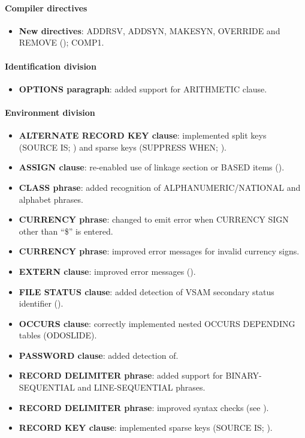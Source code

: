 \paragraph{Compiler directives}
\begin{itemize}
\item \textbf{New directives}: ADDRSV, ADDSYN, MAKESYN, OVERRIDE and REMOVE (); COMP1.
\end{itemize}

\paragraph{Identification division}
\begin{itemize}
\item \textbf{OPTIONS paragraph}: added support for ARITHMETIC clause.
\end{itemize}

\paragraph{Environment division}
\begin{itemize}
\item \textbf{ALTERNATE RECORD KEY clause}: implemented split keys (SOURCE IS; ) and sparse keys (SUPPRESS WHEN; ).
\item \textbf{ASSIGN clause}: re-enabled use of linkage section or BASED items ().
\item \textbf{CLASS phrase}: added recognition of ALPHANUMERIC\slash{}NATIONAL and alphabet phrases.
\item \textbf{CURRENCY phrase}: changed to emit error when CURRENCY SIGN other than ``\$'' is entered.
\item \textbf{CURRENCY phrase}: improved error messages for invalid currency signs.
\item \textbf{EXTERN clause}: improved error messages ().
\item \textbf{FILE STATUS clause}: added detection of VSAM secondary status identifier ().
\item \textbf{OCCURS clause}: correctly implemented nested OCCURS DEPENDING tables (ODOSLIDE).
\item \textbf{PASSWORD clause}: added detection of.
\item \textbf{RECORD DELIMITER phrase}:  added support for BINARY-SEQUENTIAL and LINE-SEQUENTIAL phrases.
\item \textbf{RECORD DELIMITER phrase}: improved syntax checks (see ).
\item \textbf{RECORD KEY clause}: implemented sparse keys (SOURCE IS; ).
\end{itemize}

